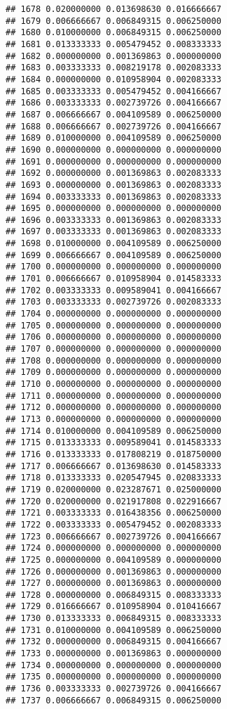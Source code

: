 \documentclass[
]{article}
\begin{document}
\begin{verbatim}
## 1678 0.020000000 0.013698630 0.016666667
## 1679 0.006666667 0.006849315 0.006250000
## 1680 0.010000000 0.006849315 0.006250000
## 1681 0.013333333 0.005479452 0.008333333
## 1682 0.000000000 0.001369863 0.000000000
## 1683 0.003333333 0.008219178 0.002083333
## 1684 0.000000000 0.010958904 0.002083333
## 1685 0.003333333 0.005479452 0.004166667
## 1686 0.003333333 0.002739726 0.004166667
## 1687 0.006666667 0.004109589 0.006250000
## 1688 0.006666667 0.002739726 0.004166667
## 1689 0.010000000 0.004109589 0.006250000
## 1690 0.000000000 0.000000000 0.000000000
## 1691 0.000000000 0.000000000 0.000000000
## 1692 0.000000000 0.001369863 0.002083333
## 1693 0.000000000 0.001369863 0.002083333
## 1694 0.003333333 0.001369863 0.002083333
## 1695 0.000000000 0.000000000 0.000000000
## 1696 0.003333333 0.001369863 0.002083333
## 1697 0.003333333 0.001369863 0.002083333
## 1698 0.010000000 0.004109589 0.006250000
## 1699 0.006666667 0.004109589 0.006250000
## 1700 0.000000000 0.000000000 0.000000000
## 1701 0.006666667 0.010958904 0.014583333
## 1702 0.003333333 0.009589041 0.004166667
## 1703 0.003333333 0.002739726 0.002083333
## 1704 0.000000000 0.000000000 0.000000000
## 1705 0.000000000 0.000000000 0.000000000
## 1706 0.000000000 0.000000000 0.000000000
## 1707 0.000000000 0.000000000 0.000000000
## 1708 0.000000000 0.000000000 0.000000000
## 1709 0.000000000 0.000000000 0.000000000
## 1710 0.000000000 0.000000000 0.000000000
## 1711 0.000000000 0.000000000 0.000000000
## 1712 0.000000000 0.000000000 0.000000000
## 1713 0.000000000 0.000000000 0.000000000
## 1714 0.010000000 0.004109589 0.006250000
## 1715 0.013333333 0.009589041 0.014583333
## 1716 0.013333333 0.017808219 0.018750000
## 1717 0.006666667 0.013698630 0.014583333
## 1718 0.013333333 0.020547945 0.020833333
## 1719 0.020000000 0.023287671 0.025000000
## 1720 0.020000000 0.021917808 0.022916667
## 1721 0.003333333 0.016438356 0.006250000
## 1722 0.003333333 0.005479452 0.002083333
## 1723 0.006666667 0.002739726 0.004166667
## 1724 0.000000000 0.000000000 0.000000000
## 1725 0.000000000 0.004109589 0.000000000
## 1726 0.000000000 0.001369863 0.000000000
## 1727 0.000000000 0.001369863 0.000000000
## 1728 0.000000000 0.006849315 0.008333333
## 1729 0.016666667 0.010958904 0.010416667
## 1730 0.013333333 0.006849315 0.008333333
## 1731 0.010000000 0.004109589 0.006250000
## 1732 0.000000000 0.006849315 0.004166667
## 1733 0.000000000 0.001369863 0.000000000
## 1734 0.000000000 0.000000000 0.000000000
## 1735 0.000000000 0.000000000 0.000000000
## 1736 0.003333333 0.002739726 0.004166667
## 1737 0.006666667 0.006849315 0.006250000

\end{verbatim}
\end{document}
